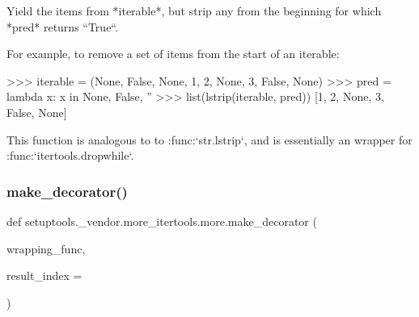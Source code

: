 \begin{DoxyVerb}Yield the items from *iterable*, but strip any from the beginning
for which *pred* returns ``True``.

For example, to remove a set of items from the start of an iterable:

    >>> iterable = (None, False, None, 1, 2, None, 3, False, None)
    >>> pred = lambda x: x in {None, False, ''}
    >>> list(lstrip(iterable, pred))
    [1, 2, None, 3, False, None]

This function is analogous to to :func:`str.lstrip`, and is essentially
an wrapper for :func:`itertools.dropwhile`.\end{DoxyVerb}
 \mbox{\label{namespacesetuptools_1_1__vendor_1_1more__itertools_1_1more_a58531b8a5db48cae80f6ef2af30de908}} 
\subsubsection{\texorpdfstring{make\+\_\+decorator()}{make\_decorator()}}
{\footnotesize\ttfamily def setuptools.\+\_\+vendor.\+more\+\_\+itertools.\+more.\+make\+\_\+decorator (\begin{DoxyParamCaption}\item[{}]{wrapping\+\_\+func,  }\item[{}]{result\+\_\+index = {} }\end{DoxyParamCaption})}

